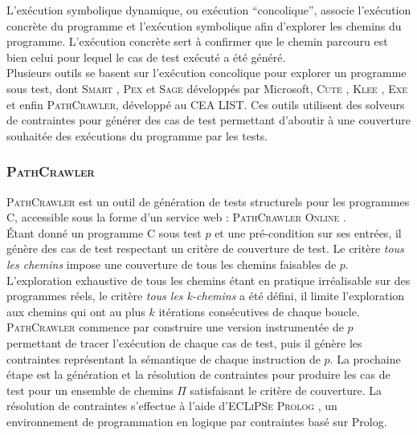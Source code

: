 L’exécution symbolique dynamique, ou exécution ``concolique'', associe
l’exécution concrète du programme et l’exécution symbolique afin d’explorer les
chemins du programme. L’exécution concrète sert à confirmer que le chemin
parcouru est bien celui pour lequel le cas de test exécuté a été généré.\\

Plusieurs outils se basent sur l'exécution concolique pour explorer un programme
sous test, dont \textsc{Smart} \cite{SMART}, \textsc{Pex} \cite{PEX} et
\textsc{Sage} \cite{SAGE} développés par Microsoft, \textsc{Cute} \cite{CUTE},
\textsc{Klee} \cite{KLEE}, \textsc{Exe} \cite{EXE} et enfin
\textsc{PathCrawler}, \cite{PathCrawler} développé au CEA LIST. Ces outils
utilisent des solveurs de contraintes pour générer des cas de test permettant
d'aboutir à une couverture souhaitée des exécutions du programme par les tests.



\subsubsection{\textsc{PathCrawler}}


\textsc{PathCrawler} \cite{PathCrawler} est un outil de génération de tests
structurels pour les programmes C, accessible sous la forme d'un service web :
\textsc{PathCrawler Online} \cite{PathCrawlerOnline}.\\

Étant donné un programme C sous test $p$ et une pré-condition sur ses entrées,
il génère des cas de test respectant un critère de couverture de test. Le
critère \emph{tous les chemins} impose une couverture de tous les chemins
faisables de $p$. L'exploration exhaustive de tous les chemins étant en pratique
irréalisable sur des programmes réels, le critère \emph{tous les k-chemins} a
été défini, il limite l'exploration aux chemins qui ont au plus $k$ itérations
consécutives de chaque boucle.\\

\textsc{PathCrawler} commence par construire une version instrumentée de $p$
permettant de tracer l'exécution de chaque cas de test, puis il génère les
contraintes représentant la sémantique de chaque instruction de $p$. La
prochaine étape est la génération et la résolution de contraintes pour produire
les cas de test pour un ensemble de chemins $\Pi$ satisfaisant le critère de
couverture. La résolution de contraintes s'effectue à l'aide
d'\textsc{ECLiPSe Prolog} \cite{ECLiPSe}, un environnement de programmation en
logique par contraintes basé sur Prolog.\\

